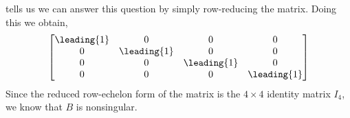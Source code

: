  tells us we can answer this question by simply row-reducing the matrix.  Doing this we obtain,
%
\begin{equation*}
\begin{bmatrix}
 \leading{1} & 0 & 0 & 0 \\
 0 & \leading{1} & 0 & 0 \\
 0 & 0 & \leading{1} & 0 \\
 0 & 0 & 0 & \leading{1}
\end{bmatrix}
\end{equation*}
%
Since the reduced row-echelon form of the matrix is the $4\times 4$ identity matrix $I_4$, we know that $B$ is nonsingular.
